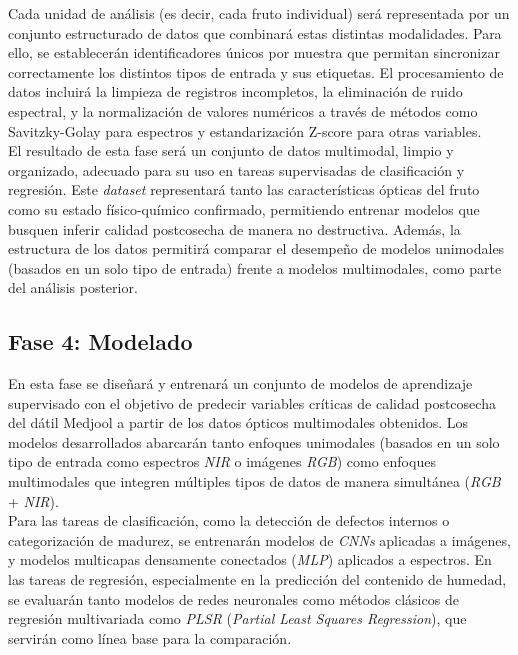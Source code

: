 Cada unidad de análisis (es decir, cada fruto individual) será representada por un conjunto estructurado de datos que combinará estas distintas modalidades. Para ello, se establecerán identificadores únicos por muestra que permitan sincronizar correctamente los distintos tipos de entrada y sus etiquetas. El procesamiento de datos incluirá la limpieza de registros incompletos, la eliminación de ruido espectral, y la normalización de valores numéricos a través de métodos como Savitzky-Golay para espectros y estandarización Z-score para otras variables.\\

El resultado de esta fase será un conjunto de datos multimodal, limpio y organizado, adecuado para su uso en tareas supervisadas de clasificación y regresión. Este \textit{dataset} representará tanto las características ópticas del fruto como su estado físico-químico confirmado, permitiendo entrenar modelos que busquen inferir calidad postcosecha de manera no destructiva. Además, la estructura de los datos permitirá comparar el desempeño de modelos unimodales (basados en un solo tipo de entrada) frente a modelos multimodales, como parte del análisis posterior.

\subsection{Fase 4: Modelado}

En esta fase se diseñará y entrenará un conjunto de modelos de aprendizaje supervisado con el objetivo de predecir variables críticas de calidad postcosecha del dátil Medjool a partir de los datos ópticos multimodales obtenidos. Los modelos desarrollados abarcarán tanto enfoques unimodales (basados en un solo tipo de entrada como espectros \textit{NIR} o imágenes \textit{RGB}) como enfoques multimodales que integren múltiples tipos de datos de manera simultánea (\textit{RGB} + \textit{NIR}).\\

Para las tareas de clasificación, como la detección de defectos internos o categorización de madurez, se entrenarán modelos de \textit{CNNs} aplicadas a imágenes, y modelos multicapas densamente conectados (\textit{MLP}) aplicados a espectros. En las tareas de regresión, especialmente en la predicción del contenido de humedad, se evaluarán tanto modelos de redes neuronales como métodos clásicos de regresión multivariada como \textit{PLSR} (\textit{Partial Least Squares Regression}), que servirán como línea base para la comparación.\\

